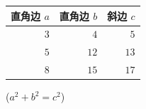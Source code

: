 \documentclass[fontset=founder]{ctexart}
\begin{document}
        \begin{table}[ht]
            \begin{tabular}{|rrr|}
                \hline
                直角边 $a$ & 直角边 $b$ & 斜边 $c$\\
                \hline
                $3$ & $4$ & $5$ \\
                \hline
                $5$ & $12$ & $13$ \\
                \hline
                $8$ & $15$ & $17$ \\
                \hline
            \end{tabular}
            \qquad
            ($a^2 + b^2 = c^2$)
        \end{table}

    
    
    
\end{document}
